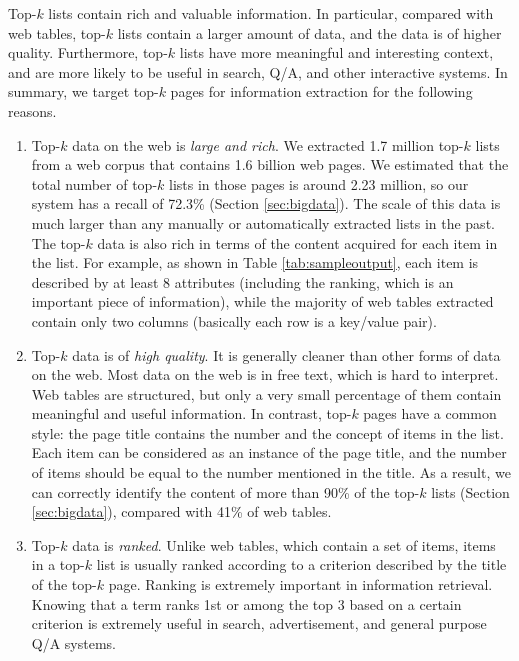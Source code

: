 Top-$k$ lists contain rich and valuable information. In particular,
compared with web tables, top-$k$ lists contain a larger amount of
data, and the data is of higher quality. Furthermore, top-$k$ lists
have more meaningful and interesting context, and are more likely
to be useful in search, Q/A, and other interactive systems. In
summary, we target top-$k$ pages for information extraction for the
following reasons.

\begin{enumerate}

\item Top-$k$ data on the web is {\em large and rich}.  We extracted
  1.7 million top-$k$ lists from %
  a web corpus that contains 1.6 billion web pages. We estimated that
  the total number of top-$k$ lists in those pages is around 2.23
  million, so our system has a recall of 72.3\% (Section \ref{sec:bigdata}). The scale of this data
  is much larger than any manually or automatically extracted lists in
  the past.  The top-$k$ data is also rich in terms of the content
  acquired for each item in the list. For example, as shown in Table
  \ref{tab:sampleoutput}, each item is described by at least 8 attributes
  (including the ranking, which is an important piece of information),
  while the majority of web tables extracted contain only two columns
  (basically each row is a key/value pair).

\item Top-$k$ data is of {\it high quality}. It is
  generally cleaner than other forms of data on the web.  
  Most data on the web is in free text, which is hard
  to interpret. Web tables are structured, but only a very small
  percentage of them contain meaningful and useful information.  In
  contrast, top-$k$ pages have a
  common style: the page title contains the number and the concept of
  items in the list.  Each item can be considered as an instance of
  the page title, and the number of items should be equal to the
  number mentioned in the title.  As a result, we can correctly
  identify the content of more than 90\% of the top-$k$ lists (Section \ref{sec:bigdata}),
  compared with 41\% of web tables\cite{webtables08}.

\item Top-$k$ data is {\it ranked}. Unlike web tables, which contain a
  set of items, items in a top-$k$ list is usually ranked according to
  a criterion described by the title of the top-$k$ page. Ranking is
  extremely important in information retrieval. Knowing that a term
  ranks 1st or among the top 3 based on a certain criterion is extremely
  useful in search, advertisement, and general purpose Q/A systems.


\end{enumerate}
